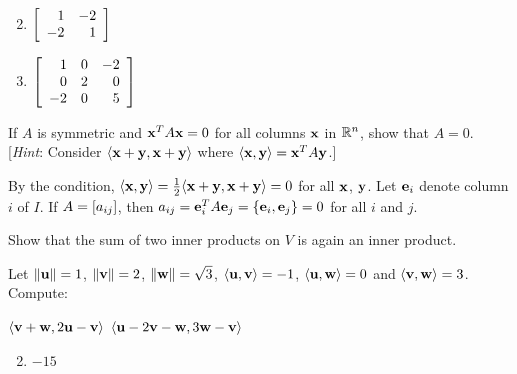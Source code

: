 \begin{multicols}{2}
\begin{ex}
{\begin{enumerate}[label={\alph*.}]
\end{enumerate}}
\begin{sol}
\begin{enumerate}[label={\alph*.}]
\setcounter{enumi}{1}
\item $\left[ \begin{array}{rr}
1 & -2 \\
-2 & 1
\end{array} \right]$

\setcounter{enumi}{3}
\item $\left[ \begin{array}{rrr}
1 & 0 & -2 \\
0 & 2 & 0 \\
-2 & 0 & 5
\end{array} \right]$

\end{enumerate}
\end{sol}
\end{ex}

\begin{ex}
If $A$ is symmetric and $\textbf{x}^{T}A\textbf{x} = 0$ for all columns $\textbf{x}$ in $\mathbb{R}^n$, show that $A = 0$. [\textit{Hint}: Consider
$\langle \textbf{x} + \textbf{y}, \textbf{x} + \textbf{y} \rangle$ where $\langle \textbf{x}, \textbf{y} \rangle = \textbf{x}^TA\textbf{y}$.]

\begin{sol}
By the condition, $\langle \textbf{x}, \textbf{y} \rangle = \tfrac{1}{2} \langle \textbf{x} + \textbf{y}, \textbf{x} + \textbf{y} \rangle = 0$ for all $\textbf{x}$, $\textbf{y}$. Let $\textbf{e}_{i}$ denote column $i$ of $I$. If $A = \left[ a_{ij} \right]$, then $a_{ij} = \textbf{e}_{i}^{T}A\textbf{e}_{j} = \{\textbf{e}_{i}, \textbf{e}_{j}\} = 0$ for all $i$ and $j$.
\end{sol}
\end{ex}

\begin{ex}
Show that the sum of two inner products on $V$ is again an inner product.
\end{ex}

\begin{ex} \label{ex:10_1_16}
Let $ \| \textbf{u} \| = 1$, $\| \textbf{v} \| = 2$, $\| \textbf{w} \| = \sqrt{3} $, $\langle \textbf{u}, \textbf{v} \rangle = -1$, $\langle\textbf{u}, \textbf{w}\rangle = 0$ and $\langle\textbf{v}, \textbf{w}\rangle = 3$. Compute:
\begin{exenumerate}
\exitem $\langle \textbf{v} + \textbf{w}, 2\textbf{u} - \textbf{v} \rangle$
\exitem $\langle \textbf{u} - 2 \textbf{v} - \textbf{w}, 3\textbf{w} - \textbf{v} \rangle$
\end{exenumerate}
\begin{sol}
\begin{enumerate}[label={\alph*.}]
\setcounter{enumi}{1}
\item  $-15$


\end{enumerate}
\end{sol}
\end{ex}
\end{multicols}
